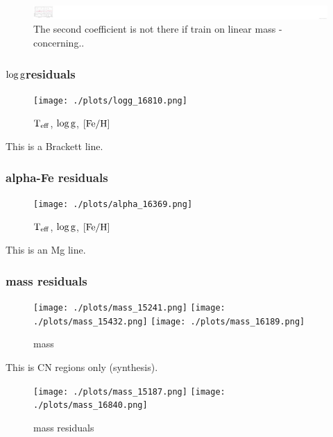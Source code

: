 \documentclass[12pt, preprint]{aastex}
\newcommand{\teff}{\mbox{$\rm T_{eff}$}}
\newcommand{\feh}{\mbox{$\rm [Fe/H]$}}
\newcommand{\logg}{\mbox{$\rm \log g$}}
\begin{document}
\begin{figure}[p!]
\centering
    \includegraphics[scale=0.51]{./plots/coeffs_m_3.png}
  \caption{The second coefficient is not there if train on linear mass - concerning..}
\label{fig:g}
\end{figure}


\subsubsection{\logg residuals}

\begin{figure}[p!]
\centering
    \texttt{[image: ./plots/logg\_16810.png]}
  \caption{\teff, \logg, \feh}
\label{fig:validation}
\end{figure}

This is a Brackett line. \\

\subsubsection{alpha-Fe residuals}

\begin{figure}[p!]
\centering
    \texttt{[image: ./plots/alpha\_16369.png]}
  \caption{\teff, \logg, \feh}
\label{fig:validation}
\end{figure}

This is an Mg line. \\

\subsubsection{mass residuals}

\begin{figure}[p!]
\centering
    \texttt{[image: ./plots/mass\_15241.png]}
        \texttt{[image: ./plots/mass\_15432.png]}
               \texttt{[image: ./plots/mass\_16189.png]}
  \caption{mass}
\label{fig:validation}
\end{figure}

This is CN regions only (synthesis). \\

\begin{figure}[p!]
\centering
    \texttt{[image: ./plots/mass\_15187.png]}
        \texttt{[image: ./plots/mass\_16840.png]}
  \caption{mass residuals}
\label{fig:validation}
\end{figure}
\end{document}
